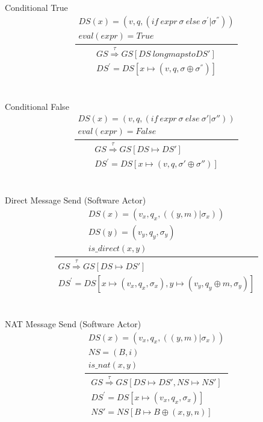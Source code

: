 \documentclass[]{article}
\begin{document}
\\\\
Conditional True
\begin{equation}
\frac
{
	\begin{gathered}
	DS(x)=(v,q,(if \ expr \ \sigma \ else \ \sigma ^{'} |\sigma ^{''})) \\
	eval(expr) = True
	\end{gathered}
}
{
	\begin{gathered}
	GS\overset{\tau}{\Rightarrow}GS[DS\ longmapsto DS'] \\
	 DS^{'}=DS[x \longmapsto(v,q,\sigma \oplus \sigma ^{''})]
	\end{gathered}
}
\end{equation}
\\\\
Conditional False
\begin{equation}\label{ConditionalFalse}
\frac
{
	\begin{gathered}
	DS(x)=(v,q,(if \ expr \ \sigma \ else \ \sigma ' |\sigma'')) \\
	eval(expr) = False
	\end{gathered}
}
{
	\begin{gathered}
	GS\overset{\tau}{\Rightarrow}GS[DS \longmapsto DS'] \\
	DS^{'}=DS[x \longmapsto(v,q,\sigma' \oplus \sigma'')]
	\end{gathered}
}
\end{equation}
\\\\
Direct Message Send (Software Actor)
\begin{equation}
\frac
{
	\begin{gathered}
	DS(x)=(v_x,q_x,((y,m) |\sigma_x)) \\
	DS(y) = (v_y,q_y,\sigma_y) \\
	is\_direct(x,y)
	\end{gathered}
}
{
	\begin{gathered}
	GS\overset{\tau}{\Rightarrow}GS[DS\longmapsto DS'] \\
	DS^{'}=DS[x \longmapsto(v_x,q_x,\sigma_x),y\longmapsto(v_y,q_y \oplus m,\sigma_y) ]
	\end{gathered}
}
\end{equation}
\\\\
NAT Message Send (Software Actor)
\begin{equation}
\frac
{
	\begin{gathered}
	DS(x)=(v_x,q_x,((y,m) |\sigma_x)) \\
	NS = (B,i) \\
	is\_nat(x,y)
	\end{gathered}
}
{
	\begin{gathered}
	GS\overset{\tau}{\Rightarrow}GS[DS\longmapsto DS', NS\longmapsto NS'] \\
	DS^{'}=DS[x \longmapsto(v_x,q_x,\sigma_x)]\\
	NS' = NS[B\longmapsto B \oplus (x,y,n)]
	\end{gathered}
}
\end{equation}
\end{document}
